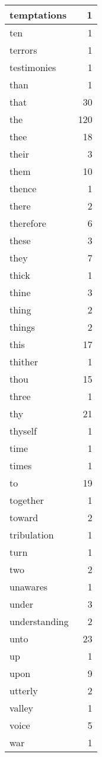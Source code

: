 \begin{center}
\begin{longtable}{l|r}
temptations & 1 \\ \hline
ten & 1 \\ \hline
terrors & 1 \\ \hline
testimonies & 1 \\ \hline
than & 1 \\ \hline
that & 30 \\ \hline
the & 120 \\ \hline
thee & 18 \\ \hline
their & 3 \\ \hline
them & 10 \\ \hline
thence & 1 \\ \hline
there & 2 \\ \hline
therefore & 6 \\ \hline
these & 3 \\ \hline
they & 7 \\ \hline
thick & 1 \\ \hline
thine & 3 \\ \hline
thing & 2 \\ \hline
things & 2 \\ \hline
this & 17 \\ \hline
thither & 1 \\ \hline
thou & 15 \\ \hline
three & 1 \\ \hline
thy & 21 \\ \hline
thyself & 1 \\ \hline
time & 1 \\ \hline
times & 1 \\ \hline
to & 19 \\ \hline
together & 1 \\ \hline
toward & 2 \\ \hline
tribulation & 1 \\ \hline
turn & 1 \\ \hline
two & 2 \\ \hline
unawares & 1 \\ \hline
under & 3 \\ \hline
understanding & 2 \\ \hline
unto & 23 \\ \hline
up & 1 \\ \hline
upon & 9 \\ \hline
utterly & 2 \\ \hline
valley & 1 \\ \hline
voice & 5 \\ \hline
war & 1 \\ \hline

\end{longtable}
\end{center}
